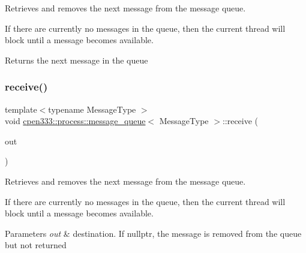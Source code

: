 Retrieves and removes the next message from the message queue. 

If there are currently no messages in the queue, then the current thread will block until a message becomes available.

\begin{DoxyReturn}{Returns}
the next message in the queue 
\end{DoxyReturn}
\mbox{\label{classcpen333_1_1process_1_1message__queue_a63eccb93a61129e6e6dec2db5f5b1f2b}} 
\subsubsection{\texorpdfstring{receive()}{receive()}\hspace{0.1cm}{\footnotesize\ttfamily [2/2]}}
{\footnotesize\ttfamily template$<$typename Message\+Type $>$ \\
void \hyperlink{classcpen333_1_1process_1_1message__queue}{cpen333\+::process\+::message\+\_\+queue}$<$ Message\+Type $>$\+::receive (\begin{DoxyParamCaption}\item[{Message\+Type $\ast$}]{out }\end{DoxyParamCaption})\hspace{0.3cm}{\ttfamily [inline]}}



Retrieves and removes the next message from the message queue. 

If there are currently no messages in the queue, then the current thread will block until a message becomes available.


\begin{DoxyParams}{Parameters}
{\em out} & destination. If {\ttfamily nullptr}, the message is removed from the queue but not returned \\
\hline
\end{DoxyParams}
\mbox{\label{classcpen333_1_1process_1_1message__queue_a1f50c208f75ad2937d11d7eca8fdb6f0}} 
